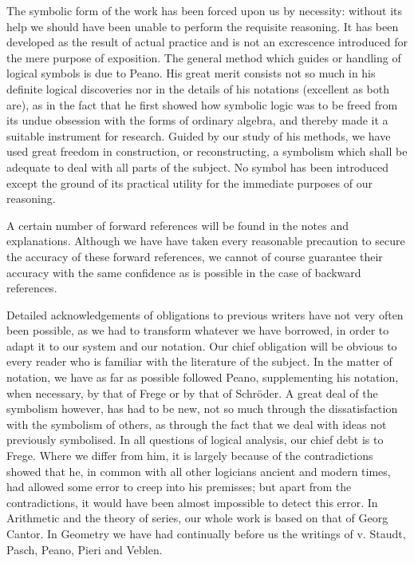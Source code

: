 \documentclass{scrartcl}
\begin{document}
The symbolic form of the work has been forced upon us by necessity: without its help we should have been unable to perform the requisite reasoning. It has been developed
as the result of actual practice and is not an excrescence introduced for the mere purpose of exposition. The general method which guides or handling of logical symbols
is due to Peano. His great merit consists not so much in his definite logical discoveries nor in the details of his notations (excellent as both are), as in the fact that
he first showed how symbolic logic was to be freed from its undue obsession with the forms of ordinary algebra, and thereby made it a suitable instrument for research. Guided
by our study of his methods, we have used great freedom in construction, or reconstructing, a symbolism which shall be adequate to deal with all parts of the subject. No
symbol has been introduced except the ground of its practical utility for the immediate purposes of our reasoning.

A certain number of forward references will be found in the notes and explanations. Although we have have taken every reasonable precaution to secure the accuracy of these
forward references, we cannot of course guarantee their accuracy with the same confidence as is possible in the case of backward references.

Detailed acknowledgements of obligations to previous writers have not very often been possible, as we had to transform whatever we have borrowed, in order to adapt it to our
system and our notation. Our chief obligation will be obvious to every reader who is familiar with the literature of the subject. In the matter of notation, we have as far as
possible followed Peano, supplementing his notation, when necessary, by that of Frege or by that of Schr\"oder. A great deal of the symbolism however, has had to be new, not 
so much through the dissatisfaction with the symbolism of others, as through the fact that we deal with ideas not previously symbolised. In all questions of logical analysis,
our chief debt is to Frege. Where we differ from him, it is largely because of the contradictions showed that he, in common with all other logicians ancient and modern times,
had allowed some error to creep into his premisses; but apart from the contradictions, it would have been almost impossible to detect this error. In Arithmetic and the theory
of series, our whole work is based on that of Georg Cantor. In Geometry we have had continually before us the writings of v. Staudt, Pasch, Peano, Pieri and Veblen.
\end{document}

